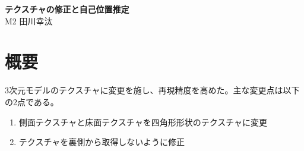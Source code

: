 \documentclass[]{jarticle}          %
\begin{document}

\vspace*{2ex}
\begin{center}
 {\Large \bf テクスチャの修正と自己位置推定}\\ %
 \vspace*{5mm}
 {\large M2 田川幸汰}%
\end{center}






\section{概要}
3次元モデルのテクスチャに変更を施し、再現精度を高めた。主な変更点は以下の2点である。
\begin{enumerate}
  \item 側面テクスチャと床面テクスチャを四角形形状のテクスチャに変更
  \item テクスチャを裏側から取得しないように修正
\end{enumerate}
  
\end{document}
